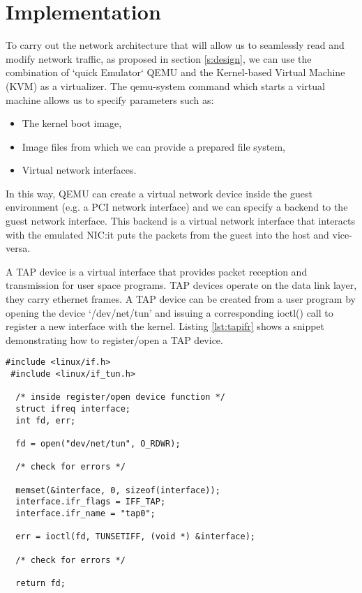 \section{Implementation} %

To carry out the network architecture that will allow us to seamlessly read and modify
network traffic, as proposed in section \ref{s:design}, we can use the combination of
`quick Emulator` QEMU and the Kernel-based Virtual Machine (KVM) as a virtualizer. The qemu-system command which
starts a virtual machine allows us to specify parameters such as:
\begin{itemize}
  \item The kernel boot image,
  \item Image files from which we can provide a prepared file system,
  \item Virtual network interfaces.
\end{itemize}

In this way, QEMU can create a virtual network device
inside the guest environment (e.g. a PCI network interface) and we can specify a backend to the
guest network interface. This backend is a virtual network interface that interacts with the
emulated NIC:\@ it puts the packets from the guest into the host and vice-versa\cite{DocumentationNetworkingQEMU}.

A TAP device is a virtual interface that provides packet reception and transmission for user space programs.
TAP devices operate on the data link layer, they carry ethernet frames.
A TAP device can be created from a user program by opening the device `/dev/net/tun'  and issuing a
corresponding ioctl() call to register a new interface with the kernel\cite{krasnyanskyUniversalTUNTAP}.
Listing \ref{lst:tapifr} shows a snippet demonstrating how to register/open a TAP device.

\begin{lstlisting}[caption={Registering/opening a TAP interface}, label={lst:tapifr},  style=CStyle]
 #include <linux/if.h>
 #include <linux/if_tun.h>

  /* inside register/open device function */
  struct ifreq interface;
  int fd, err;

  fd = open("dev/net/tun", O_RDWR);

  /* check for errors */

  memset(&interface, 0, sizeof(interface));
  interface.ifr_flags = IFF_TAP;
  interface.ifr_name = "tap0";

  err = ioctl(fd, TUNSETIFF, (void *) &interface);

  /* check for errors */

  return fd;
\end{lstlisting}



